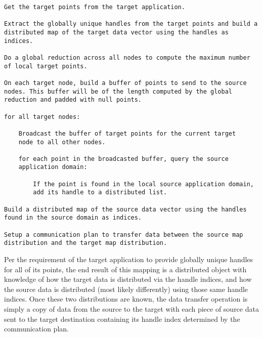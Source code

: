 \documentclass[letterpaper]{article}
\begin{document}
\begin{verbatim}
Get the target points from the target application.

Extract the globally unique handles from the target points and build a
distributed map of the target data vector using the handles as indices.

Do a global reduction across all nodes to compute the maximum number
of local target points.

On each target node, build a buffer of points to send to the source
nodes. This buffer will be of the length computed by the global
reduction and padded with null points.

for all target nodes:

    Broadcast the buffer of target points for the current target
    node to all other nodes.

    for each point in the broadcasted buffer, query the source
    application domain:

        If the point is found in the local source application domain,
        add its handle to a distributed list.

Build a distributed map of the source data vector using the handles
found in the source domain as indices.

Setup a communication plan to transfer data between the source map
distribution and the target map distribution.
\end{verbatim}

Per the requirement of the target application to provide globally
unique handles for all of its points, the end result of this mapping
is a distributed object with knowledge of how the target data is
distributed via the handle indices, and how the source
data is distributed (most likely differently) using those same handle
indices. Once these two distributions are known, the data transfer
operation is simply a copy of data from the source to the target with
each piece of source data sent to the target destination containing
its handle index determined by the communication plan. 

\end{document}
